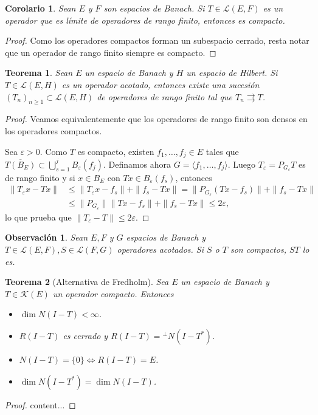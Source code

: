 \documentclass[11pt]{report}
\theoremstyle{colored}
\newtheorem{theorem}{Teorema}[section]
\newtheorem{corollary}{Corolario}[section]
\newtheorem{remark}{Observación}[section]
\newcommand{\eps}{\varepsilon}
\begin{document}
\begin{corollary} Sean $E$ y $F$ son espacios de Banach. Si $T \in \mathscr{L}(E,F)$ es un operador que es límite de operadores de rango finito, entonces es compacto.
\end{corollary}
\begin{proof} Como los operadores compactos forman un subespacio cerrado, resta notar que un operador de rango finito siempre es compacto.
\end{proof}

\begin{theorem} Sean $E$ un espacio de Banach y $H$ un espacio de Hilbert. Si $T \in \mathscr{L}(E,H)$ es un operador acotado, entonces existe una sucesión $(T_n)_{n \geq 1} \subset  \mathscr{L}(E,H)$ de operadores de rango finito tal que $T_n \rightrightarrows T$.
\end{theorem}
\begin{proof} Veamos equivalentemente que los operadores de rango finito son densos en los operadores compactos.

Sea $\eps > 0$. Como $T$ es compacto, existen $f_1, \dots, f_j \in E$ tales que
$\overline{T(B_E)} \subset \bigcup_{s=1}^jB_\eps(f_j)$. Definamos ahora $G = \langle f_1, \dots, f_j \rangle$. Luego $T_\eps = P_{G_\eps}T$ es de rango finito y si $x \in B_E$ con $Tx \in B_\eps(f_s)$, entonces 
\begin{align*}
\|T_\eps x - Tx\| &\leq \|T_\eps x - f_s\| + \|f_s -Tx\| = \|P_{G_\eps}(Tx - f_s)\| + \|f_s -Tx\|\\
&\leq \|P_{G_\eps}\|\|Tx - f_s\| + \|f_s - Tx\| \leq 2\eps,
\end{align*}
lo que prueba que $\|T_\eps -T\| \leq 2\eps$.
\end{proof}

\begin{remark} Sean $E,F$ y $G$ espacios de Banach y $T \in \mathscr{L}(E,F), S \in \mathscr{L}(F,G)$ operadores acotados. Si $S$ o $T$ son compactos, $ST$ lo es.
\end{remark}

\begin{theorem}[Alternativa de Fredholm] Sea $E$ un espacio de Banach y $T \in \mathscr{K}(E)$ un operador compacto. Entonces
\begin{itemize}
\item[(a)] $\dim N(I-T) < \infty$.
\item[(b)] $R(I-T)$ es cerrado y $R(I-T) = {}^\perp N(I-T^*)$.
\item[(c)] $N(I-T) = \{0\} \iff R(I-T) = E$.
\item[(d)] $\dim N(I-T^*) = \dim N(I-T)$.
\end{itemize} 
\end{theorem}
\begin{proof}
content...
\end{proof}
\end{document}
